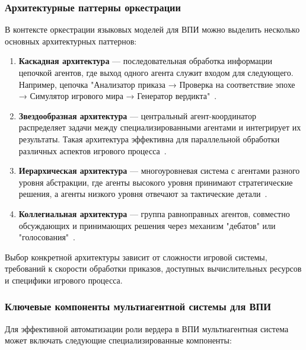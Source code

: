 \subsubsection{Архитектурные паттерны оркестрации}

В контексте оркестрации языковых моделей для ВПИ можно выделить несколько основных архитектурных паттернов:

\begin{enumerate}
    \item \textbf{Каскадная архитектура} — последовательная обработка информации цепочкой агентов, где выход одного агента служит входом для следующего. Например, цепочка "{}Анализатор приказа → Проверка на соответствие эпохе → Симулятор игрового мира → Генератор вердикта"{}~\cite{shen2023hugginggpt}.

    \item \textbf{Звездообразная архитектура} — центральный агент-координатор распределяет задачи между специализированными агентами и интегрирует их результаты. Такая архитектура эффективна для параллельной обработки различных аспектов игрового процесса~\cite{mialon2023augmented}.

    \item \textbf{Иерархическая архитектура} — многоуровневая система с агентами разного уровня абстракции, где агенты высокого уровня принимают стратегические решения, а агенты низкого уровня отвечают за тактические детали~\cite{wu2023autogen}.

    \item \textbf{Коллегиальная архитектура} — группа равноправных агентов, совместно обсуждающих и принимающих решения через механизм "{}дебатов"{} или "{}голосования"{}~\cite{du2023improving}.
\end{enumerate}

Выбор конкретной архитектуры зависит от сложности игровой системы, требований к скорости обработки приказов, доступных вычислительных ресурсов и специфики игрового процесса.

\subsubsection{Ключевые компоненты мультиагентной системы для ВПИ}

Для эффективной автоматизации роли вердера в ВПИ мультиагентная система может включать следующие специализированные компоненты:

